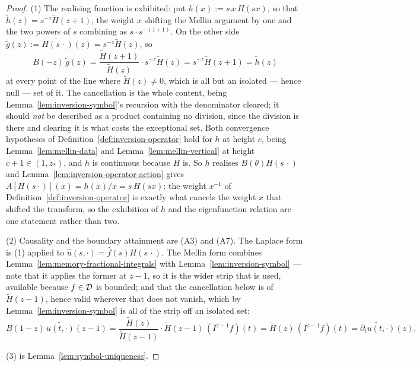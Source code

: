 \begin{proof}
(1) The realising function is exhibited: put $h(x) := s\,x\,H(sx)$, so that
$\tilde h(z) = s^{-z}\tilde H(z+1)$, the weight $x$ shifting the Mellin argument by one and the
two powers of $s$ combining as $s\cdot s^{-(z+1)}$. On the other side
$\tilde g(z) := \widetilde{H(s\,\cdot)}(z) = s^{-z}\tilde H(z)$, so
\[
  B(-z)\,\tilde g(z)
  = \frac{\tilde H(z+1)}{\tilde H(z)}\cdot s^{-z}\tilde H(z)
  = s^{-z}\tilde H(z+1)
  = \tilde h(z)
\]
at every point of the line where $\tilde H(z) \ne 0$, which is all but an isolated --- hence
null --- set of it. The cancellation is the whole content, being
Lemma~\ref{lem:inversion-symbol}'s recursion with the denominator cleared; it should
\emph{not} be described as a product containing no division, since the division is there and
clearing it is what costs the exceptional set. Both convergence hypotheses of
Definition~\ref{def:inversion-operator} hold for $h$ at height $c$, being
Lemma~\ref{lem:mellin-data} and Lemma~\ref{lem:mellin-vertical} at height
$c + 1 \in (1, z_*)$, and $h$ is continuous because $H$ is. So $h$ realises
$B(\theta)H(s\,\cdot)$ and Lemma~\ref{lem:inversion-operator-action} gives
$A[H(s\cdot)](x) = h(x)/x = s\,H(sx)$: the weight $x^{-1}$ of
Definition~\ref{def:inversion-operator} is exactly what cancels the weight $x$ that shifted
the transform, so the exhibition of $h$ and the eigenfunction relation are one statement
rather than two.

(2) Causality and the boundary attainment are (A3) and (A7). The Laplace form is (1) applied
to $\hat u(s, \cdot) = \hat f(s) H(s\,\cdot)$. The Mellin form combines
Lemma~\ref{lem:memory-fractional-integrals} with Lemma~\ref{lem:inversion-symbol} --- note
that it applies the former at $z - 1$, so it is the wider strip that is used, available
because $f \in \mathcal{D}$ is bounded; and that the cancellation below is of $\tilde H(z-1)$, hence
valid wherever that does not vanish, which by Lemma~\ref{lem:inversion-symbol} is all of the
strip off an isolated set:
\[
  B(1-z)\,\widetilde{u(t,\cdot)}(z-1)
  = \frac{\tilde H(z)}{\tilde H(z-1)}\cdot\tilde H(z-1)\,(I^{z-1}f)(t)
  = \tilde H(z)\,(I^{z-1}f)(t)
  = \widetilde{\partial_t u(t,\cdot)}(z).
\]

(3) is Lemma~\ref{lem:symbol-uniqueness}.
\end{proof}

